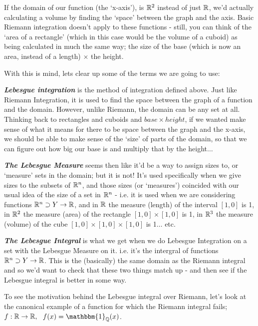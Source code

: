 \begin{figure}[H]
\begin{minipage}{.5\textwidth}
  \label{fig:test1}
\end{minipage}
\end{figure}

If the domain of our function (the `x-axis'), is $\mathbb{R}^2$ instead of just $\mathbb{R}$, we'd actually calculating a volume by finding the `space' between the graph and the axis. Basic Riemann integration doesn't apply to these functions - still, you can think of the `area of a rectangle' (which in this case would be the volume of a cuboid) as being calculated in much the same way; the size of the base (which is now an area, instead of a length) $\times$ the height.

With this is mind, lets clear up some of the terms we are going to use:

{\bf \em Lebesgue integration\/} is the method of integration defined above. Just like Riemann Integration, it is used to find the space between the graph of a function and the domain. However, unlike Riemann, the domain can be any set at all. Thinking back to rectangles and cuboids and $base \times height$, if we wanted make sense of what it means for there to be space between the graph and the x-axis, we should be able to make sense of the `size' of parts of the domain, so that we can figure out how big our base is and multiply that by the height$\ldots$

{\bf \em The Lebesgue Measure\/} seems then like it'd be a way to assign sizes to, or `measure' sets in the domain; but it is not! It's used specifically when we give sizes to the subsets of $\mathbb{R}^n$, and those sizes (or `measures') coincided with our usual idea of the size of a set in $\mathbb{R}^n$ - i.e. it is used when we are considering functions $\mathbb{R}^n \supset Y \rightarrow \mathbb{R}$, and in $\mathbb{R}$ the measure (length) of the interval $[1, 0]$ is 1, in $\mathbb{R}^2$ the measure (area) of the rectangle $[1, 0] \times [1, 0]$ is 1, in $\mathbb{R}^3$ the measure (volume) of the cube $[1, 0] \times [1, 0] \times [1, 0]$ is 1$\ldots$ etc. 

{\bf \em The Lebesgue Integral\/} is what we get when we do Lebesgue Integration on a set with the Lebesgue Measure on it. i.e. it's the intergral of functions $\mathbb{R}^n \supset Y \rightarrow \mathbb{R}$. This is the (basically) the same domain as the Riemann integral and so we'd want to check that these two things match up - and then see if the Lebesgue integral is better in some way.

To see the motivation behind the Lebesgue integral over Riemann, let's look at the canonical example of a function for which the Riemann integral fails; $f:\R \rightarrow \R,\ \ f(x) = \mathbbm{1}_\Q(x)$.

